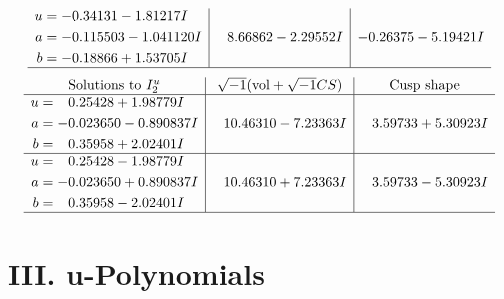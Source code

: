 \documentclass[1p]{elsarticle_modified}
\theoremstyle{definition}
\newcommand{\I}{\sqrt{-1}}
\begin{document}
$$\begin{array}{c|c|c}
\begin{aligned}
u &= -0.34131 - 1.81217 I \\
a &= -0.115503 - 1.041120 I \\
b &= -0.18866 + 1.53705 I\end{aligned}
 & \phantom{-}8.66862 - 2.29552 I & -0.26375 - 5.19421 I\\
 \hline 
 \end{array}$$\newpage$$\begin{array}{c|c|c}  
\text{Solutions to }I^u_{2}& \I (\text{vol} + \sqrt{-1}CS) & \text{Cusp shape}\\
 \hline 
\begin{aligned}
u &= \phantom{-}0.25428 + 1.98779 I \\
a &= -0.023650 - 0.890837 I \\
b &= \phantom{-}0.35958 + 2.02401 I\end{aligned}
 & \phantom{-}10.46310 - 7.23363 I & \phantom{-}3.59733 + 5.30923 I \\ \hline\begin{aligned}
u &= \phantom{-}0.25428 - 1.98779 I \\
a &= -0.023650 + 0.890837 I \\
b &= \phantom{-}0.35958 - 2.02401 I\end{aligned}
 & \phantom{-}10.46310 + 7.23363 I & \phantom{-}3.59733 - 5.30923 I\\
 \hline 
 \end{array}$$\newpage
\newpage\renewcommand{\arraystretch}{1}
\centering \section*{ III. u-Polynomials}
\end{document}
